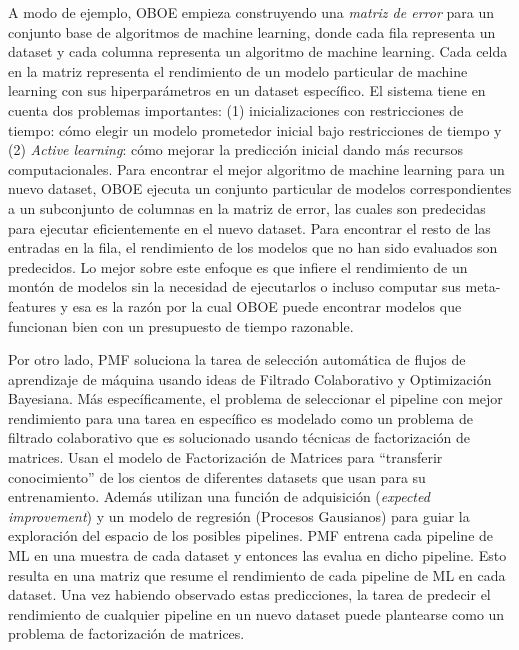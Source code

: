 A modo de ejemplo, OBOE \cite{yang2018oboe} empieza construyendo una \textit{matriz de error} para un conjunto base de algoritmos de machine learning, donde cada fila representa un dataset y cada columna representa un algoritmo de machine learning. Cada celda en la matriz representa el rendimiento de un modelo particular de machine learning con sus hiperparámetros en un dataset específico. El sistema tiene en cuenta dos problemas importantes: (1) inicializaciones con restricciones de tiempo: cómo elegir un modelo prometedor inicial bajo restricciones de tiempo y (2) \textit{Active learning}: cómo mejorar la predicción inicial dando más recursos computacionales. Para encontrar el mejor algoritmo de machine learning para un nuevo dataset, OBOE ejecuta un conjunto particular de modelos correspondientes a un subconjunto de columnas en la matriz de error, las cuales son predecidas para ejecutar eficientemente en el nuevo dataset. Para encontrar el resto de las entradas en la fila, el rendimiento de los modelos que no han sido evaluados son predecidos. Lo mejor sobre este enfoque es que infiere el rendimiento de un montón de modelos sin la necesidad de ejecutarlos o incluso computar sus meta-features  y esa es la razón por la cual OBOE puede encontrar modelos que funcionan bien con un presupuesto de tiempo razonable.

Por otro lado, PMF \cite{fusi2018advances} soluciona la tarea de selección automática de flujos de aprendizaje de máquina usando ideas de Filtrado Colaborativo y Optimización Bayesiana. Más específicamente, el problema de seleccionar el pipeline con mejor rendimiento para una tarea en específico es modelado como un problema de filtrado colaborativo que es solucionado usando técnicas de factorización de matrices. Usan el modelo de Factorización de Matrices para ``transferir conocimiento'' de los cientos de diferentes datasets que usan para su entrenamiento. Además utilizan una función de adquisición (\textit{expected improvement}) y un modelo de regresión (Procesos Gausianos) para guiar la exploración del espacio de los posibles pipelines. PMF entrena cada pipeline de ML en una muestra de cada dataset y entonces las evalua en dicho pipeline. Esto resulta en una matriz que resume el rendimiento de cada pipeline de ML en cada dataset. Una vez habiendo observado estas predicciones, la tarea de predecir el rendimiento de cualquier pipeline en un nuevo dataset puede plantearse como un problema de factorización de matrices.

